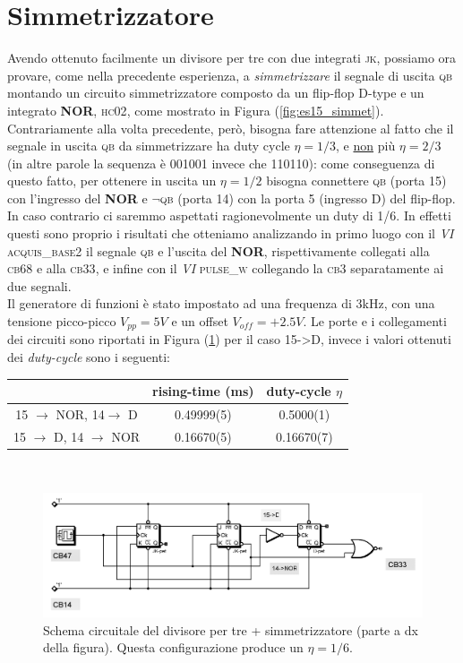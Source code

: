 \documentclass[journal, a4paper]{IEEEtran}
\begin{document}
\section{Simmetrizzatore}
Avendo ottenuto facilmente un divisore per tre con due integrati \textsc{jk}, possiamo ora provare, come nella precedente esperienza, a \textit{simmetrizzare} il segnale di uscita \textsc{qb} montando un circuito simmetrizzatore composto da un flip-flop D-type e un integrato \textbf{NOR}, \textsc{hc02}, come mostrato in Figura (\ref{fig:es15_simmet}).\\
Contrariamente alla volta precedente, però, bisogna fare attenzione al fatto che il segnale in uscita \textsc{qb} da simmetrizzare ha duty cycle $\eta = 1/3$, e \underline{non} più $\eta = 2/3$ (in altre parole la sequenza è 001001 invece che 110110): come conseguenza di questo fatto, per ottenere in uscita un $\eta = 1/2$ bisogna connettere \textsc{qb} (porta 15) con l'ingresso del \textbf{NOR} e \textsc{$\neg$qb} (porta 14) con la porta 5 (ingresso D) del flip-flop. In caso contrario ci saremmo aspettati ragionevolmente un duty di 1/6. In effetti questi sono proprio i risultati che otteniamo analizzando in primo luogo con il \textit{VI} \textsc{acquis\_base2} il segnale \textsc{qb} e l'uscita del \textbf{NOR}, rispettivamente collegati alla \textsc{cb68} e alla \textsc{cb33}, e infine con il \textit{VI} \textsc{pulse\_w} collegando la \textsc{cb3} separatamente ai due segnali.\\
Il generatore di funzioni è stato impostato ad una frequenza di 3kHz, con una tensione picco-picco $V_{pp} = 5V$ e un offset $V_{off} = +2.5V$. Le porte e i collegamenti dei circuiti sono riportati in Figura (\ref{fig:simm_div_3}) per il caso 15->D, invece i valori ottenuti dei \textit{duty-cycle} sono i seguenti:\\

\begin{table}[h]
\centering
\begin{tabular}{c|c|c}
\hline  & rising-time (ms) & duty-cycle $\eta$\\ 
\hline 15 $\rightarrow$ NOR, 14$\rightarrow$ D & 0.49999(5) & 0.5000(1) \\ 
\hline 15 $\rightarrow$ D, 14 $\rightarrow$ NOR & 0.16670(5) & 0.16670(7) \\ 
\hline
\end{tabular} 
\end{table}
~\\

\begin{figure}
\centering
\includegraphics[width=0.8\linewidth]{./simm_div_3}
\caption{Schema circuitale del divisore per tre + simmetrizzatore (parte a dx della figura). Questa configurazione produce un $\eta = 1/6$.}
\label{fig:simm_div_3}
\end{figure}
\end{document}
